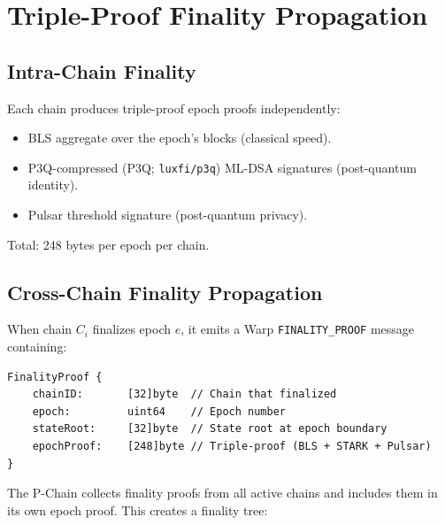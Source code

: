 \section{Triple-Proof Finality Propagation}


\subsection{Intra-Chain Finality}

Each chain produces triple-proof epoch proofs independently:
\begin{itemize}[leftmargin=2em]
\item BLS aggregate over the epoch's blocks (classical speed).
\item P3Q-compressed (P3Q; \texttt{luxfi/p3q}) ML-DSA signatures (post-quantum identity).
\item Pulsar threshold signature (post-quantum privacy).
\end{itemize}

Total: 248 bytes per epoch per chain.

\subsection{Cross-Chain Finality Propagation}

When chain $C_i$ finalizes epoch $e$, it emits a Warp \texttt{FINALITY\_PROOF} message containing:

\begin{verbatim}
FinalityProof {
    chainID:       [32]byte  // Chain that finalized
    epoch:         uint64    // Epoch number
    stateRoot:     [32]byte  // State root at epoch boundary
    epochProof:    [248]byte // Triple-proof (BLS + STARK + Pulsar)
}
\end{verbatim}

The P-Chain collects finality proofs from all active chains and includes them in its own epoch proof. This creates a finality tree:

\begin{center}
\end{center}

